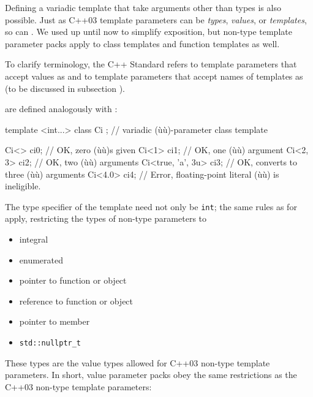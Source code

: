 Defining a variadic template that take arguments other than types is
also possible. Just as C++03 template parameters can be \emph{types},
\emph{values}, or \emph{templates}, so can . We used  up until now to
simplify exposition, but non-type template parameter packs apply to
class templates and function templates as well.

To clarify terminology, the C++ Standard refers to template parameters
that accept values as  and to
template parameters that accept names of templates as  (to be discussed in subsection
).

 are defined analogously with
:

\begin{emcppslisting}
template <int...>
class Ci { };           // variadic (ù{}ù)-parameter class template

Ci<>              ci0;  // OK, zero (ù{}ù)s given
Ci<1>             ci1;  // OK, one (ù{}ù) argument
Ci<2, 3>          ci2;  // OK, two (ù{}ù) arguments
Ci<true, 'a', 3u> ci3;  // OK, converts to three (ù{}ù) arguments
Ci<4.0>           ci4;  // Error, floating-point literal (ù{}ù) is ineligible.
\end{emcppslisting}
    

\noindent The type specifier of the template  need
not only be \lstinline!int!; the same rules as for  apply, restricting the types of non-type parameters to
\begin{itemize}
\item{integral}
\item{enumerated}
\item{pointer to function or object}
\item{ reference to function or object}
\item{pointer to member}
\item{\lstinline!std::nullptr_t!}
\end{itemize}
These types are the value types allowed for C++03 non-type template
parameters. In short, value parameter packs obey the same restrictions
as the C++03 non-type template parameters:

